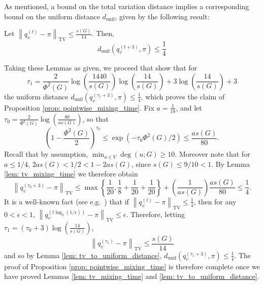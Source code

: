 \documentclass[11pt,twoside]{article}
\newcommand{\set}[1]{\left\{#1\right\}}
\newcommand{\norm}[1]{\left\lVert#1\right\rVert}
\newcommand{\1}{\mathbbm{1}}
\begin{document}
As mentioned, a bound on the total variation distance implies a corresponding bound on the uniform distance $d_{\mathrm{unif}}$, given by the following result:
\begin{lemma}
	\label{lem: tv_to_uniform_distance}
	Let $\norm{q_v^{(t)} - \pi}_{\mathrm{TV}} \leq \frac{s(G)}{14}$. Then,
	\begin{equation*}
	d_{\mathrm{unif}}(q_v^{(t + 3)},\pi) \leq \frac{1}{4}
	\end{equation*}
\end{lemma}

\noindent Taking these Lemmas as given, we proceed that show that for
\begin{equation*}
\tau_1 = \frac{2}{\Phi^2(G)} \log \left(\frac{1440}{s(G)}\right)\log \left(\frac{14}{s(G)}\right)  + 3 \log \left(\frac{14}{s(G)}\right) + 3
\end{equation*}
the uniform distance $d_{\textrm{unif}}(q_v^{(\tau_1 + 3)}, \pi) \leq \frac{1}{4}$, which proves the claim of Proposition \ref{prop: pointwise_mixing_time}. Fix $a = \frac{1}{18}$, and let $\tau_0 = \frac{2}{\Phi^2(G)} \log \left(\frac{80}{a s(G)}\right)$, so that
\begin{equation*}
\left(1 - \frac{\Phi^2(G)}{2}\right)^{\tau_0} \leq \exp(- \tau_0\Phi^2(G)/2) \leq \frac{as(G)}{80}.
\end{equation*}
Recall that by assumption, $\min_{u \in V} \deg(u;G) \geq 10$. Moreover note that for $a \leq 1/4$, $2as(G) < 1/2 < 1 - 2as(G)$, since $s(G) \leq 9/10 < 1$. By Lemma \ref{lem: tv_mixing_time} we therefore obtain
\begin{equation*}
\norm{q_v^{(\tau_0 + 3)} - \pi}_{\mathrm{TV}} \leq \max \set{\frac{1}{20}, \frac{1}{8} + \frac{1}{20} + \frac{1}{20}} + \left(\frac{1}{as(G)}\right) \frac{as(G)}{80} \leq \frac{1}{4}.
\end{equation*}
It is a well-known fact (see e.g.~\cite{montenegro2002}) that if $\norm{q_v^{(t)} - \pi}_{\mathrm{TV}} \leq \frac{1}{4}$, then for any $0 < \epsilon < 1$, $\norm{q_v^{(t\log_2(1/\epsilon))} - \pi}_{\mathrm{TV}} \leq \epsilon$. Therefore, letting $\tau_1 = (\tau_0 + 3) \log(\frac{14}{s(G)})$, 
\begin{equation*}
\norm{q_v^{(\tau_1)} - \pi}_{\mathrm{TV}} \leq \frac{s(G)}{14}
\end{equation*}
and so by Lemma \ref{lem: tv_to_uniform_distance}, $d_{\textrm{unif}}(q_v^{(\tau_1 + 3)}, \pi) \leq \frac{1}{4}$. The proof of Proposition \ref{prop: pointwise_mixing_time} is therefore complete once we have proved Lemmas \ref{lem: tv_mixing_time} and \ref{lem: tv_to_uniform_distance}.
\end{document}
